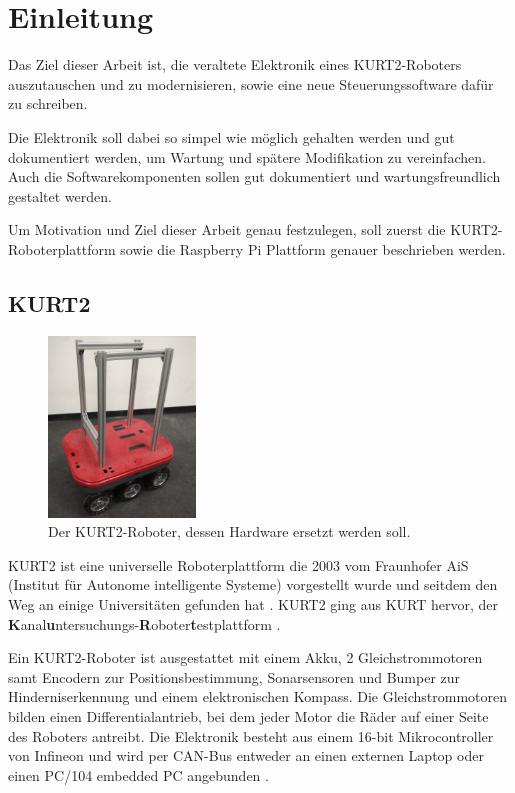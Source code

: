 \documentclass[german]{thesis_KBS}
\begin{document}
\chapter{Einleitung}

Das Ziel dieser Arbeit ist, die veraltete Elektronik eines KURT2-Roboters
auszutauschen und zu modernisieren, sowie eine neue Steuerungssoftware dafür zu
schreiben.

Die Elektronik soll dabei so simpel wie möglich gehalten werden und gut
dokumentiert werden, um Wartung und spätere Modifikation zu vereinfachen. Auch
die Softwarekomponenten sollen gut dokumentiert und wartungsfreundlich gestaltet
werden.

Um Motivation und Ziel dieser Arbeit genau festzulegen, soll zuerst die
KURT2-Roboterplattform sowie die Raspberry Pi Plattform genauer beschrieben
werden.


\section{KURT2}

\begin{figure}
    \vspace{-12pt}
    \centering \includegraphics[width=0.35\textwidth]{KURT.png}
    \caption{Der KURT2-Roboter, dessen Hardware ersetzt werden soll.}
    \label{fig:kurt}
\end{figure}

KURT2 ist eine universelle Roboterplattform die 2003 vom Fraunhofer AiS
(Institut für Autonome intelligente Systeme) vorgestellt wurde und seitdem den
Weg an einige Universitäten gefunden hat \cite{kurt2-zdnet}. KURT2 ging aus KURT
hervor, der
\textbf{K}anal\-\textbf{u}ntersuchungs\hyp{}\textbf{R}oboter\textbf{t}estplattform
\cite{kurt2-home}.

Ein KURT2-Roboter ist ausgestattet mit einem Akku, 2 Gleichstrommotoren samt
Encodern zur Positionsbestimmung, Sonarsensoren und Bumper zur
Hinderniserkennung und einem elektronischen Kompass. Die Gleichstrommotoren
bilden einen Differentialantrieb, bei dem jeder Motor die Räder auf einer Seite
des Roboters antreibt. Die Elektronik besteht aus einem 16-bit Mikrocontroller
von Infineon und wird per CAN-Bus entweder an einen externen Laptop oder einen
PC/104 embedded PC angebunden \cite{kurt2-hardware}.
\end{document}
